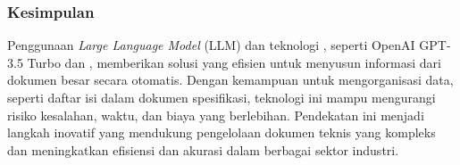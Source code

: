 \subsubsection{Kesimpulan}

Penggunaan \emph{Large Language Model} (LLM) dan teknologi \cv, seperti OpenAI GPT-3.5 Turbo dan \donut, memberikan solusi yang efisien untuk menyusun informasi dari dokumen besar secara otomatis. Dengan kemampuan untuk mengorganisasi data, seperti daftar isi dalam dokumen spesifikasi, teknologi ini mampu mengurangi risiko kesalahan, waktu, dan biaya yang berlebihan. Pendekatan ini menjadi langkah inovatif yang mendukung pengelolaan dokumen teknis yang kompleks dan meningkatkan efisiensi dan akurasi dalam berbagai sektor industri. 